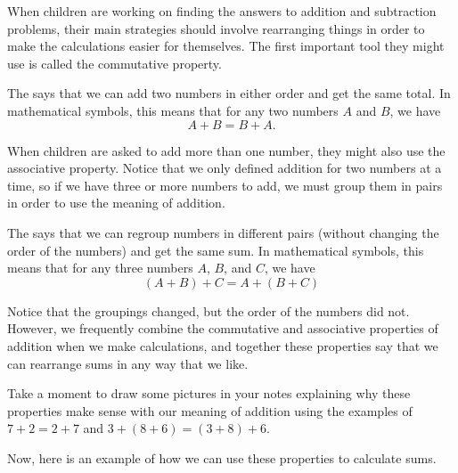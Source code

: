 \documentclass{ximera}
\begin{document}
When children are working on finding the answers to addition and subtraction problems, their main strategies should involve rearranging things in order to make the calculations easier for themselves. The first important tool they might use is called the commutative property.

\begin{definition}
The  says that we can add two numbers in either order and get the same total. In mathematical symbols, this means that for any two numbers $A$ and $B$, we have
\[
A + B = B + A.
\]
\end{definition}

When children are asked to add more than one number, they might also use the associative property. Notice that we only defined addition for two numbers at a time, so if we have three or more numbers to add, we must group them in pairs in order to use the meaning of addition.
\begin{definition}
The  says that we can regroup numbers in different pairs (without changing the order of the numbers) and get the same sum. In mathematical symbols, this means that for any three numbers $A$, $B$, and $C$, we have
\[
(A + B) + C = A + (B+C)
\]
\end{definition}
Notice that the groupings changed, but the order of the numbers did not. However, we frequently combine the commutative and associative properties of addition when we make calculations, and together these properties say that we can rearrange sums in any way that we like.

Take a moment to draw some pictures in your notes explaining why these properties make sense with our meaning of addition using the examples of $7+2 = 2+7$ and $3+(8+6) = (3+8)+6$.

Now, here is an example of how we can use these properties to calculate sums.
\end{document}
